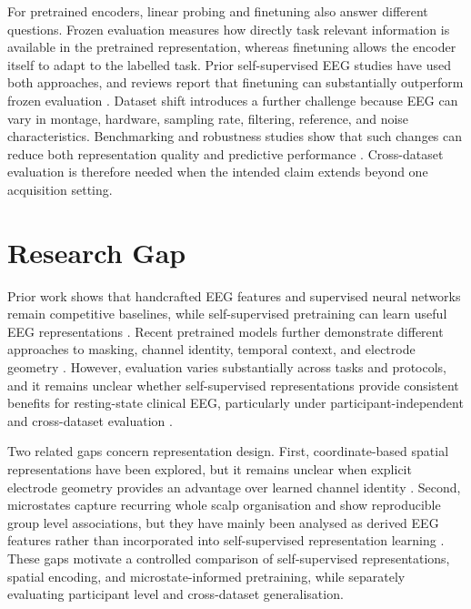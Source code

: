 For pretrained encoders, linear probing and finetuning also answer different questions. Frozen evaluation measures how directly task relevant information is available in the pretrained representation, whereas finetuning allows the encoder itself to adapt to the labelled task. Prior self-supervised EEG studies have used both approaches, and reviews report that finetuning can substantially outperform frozen evaluation \parencite{banvilleUncoveringStructureClinical2020,kuruppuEEGFoundationModels2025}. Dataset shift introduces a further challenge because EEG can vary in montage, hardware, sampling rate, filtering, reference, and noise characteristics. Benchmarking and robustness studies show that such changes can reduce both representation quality and predictive performance \parencite{engemannReusableBenchmarkBrainAge2021,waghEvaluatingLatentSpaceRobustness2022}. Cross-dataset evaluation is therefore needed when the intended claim extends beyond one acquisition setting.

\section{Research Gap}\label{sec:rel_positioning}

Prior work shows that handcrafted EEG features and supervised neural networks remain competitive baselines, while self-supervised pretraining can learn useful EEG representations \parencite{gemeinMachineLearningBasedDiagnostics2020,banvilleUncoveringStructureClinical2020,kostasBENDRUsingTransformers2021}. Recent pretrained models further demonstrate different approaches to masking, channel identity, temporal context, and electrode geometry \parencite{jiangLARGEBRAINMODEL2024,wangEEGPTPretrainedTransformer2024,wangCBraModCrissCrossBrain2025a,el2026reve}. However, evaluation varies substantially across tasks and protocols, and it remains unclear whether self-supervised representations provide consistent benefits for resting-state clinical EEG, particularly under participant-independent and cross-dataset evaluation \parencite{kuruppuEEGFoundationModels2025}.

Two related gaps concern representation design. First, coordinate-based spatial representations have been explored, but it remains unclear when explicit electrode geometry provides an advantage over learned channel identity \parencite{el2026reve}. Second, microstates capture recurring whole scalp organisation and show reproducible group level associations, but they have mainly been analysed as derived EEG features rather than incorporated into self-supervised representation learning \parencite{khannaReliabilityRestingStateMicrostate2014a,koenigEEGMetaMicrostates2023}. These gaps motivate a controlled comparison of self-supervised representations, spatial encoding, and microstate-informed pretraining, while separately evaluating participant level and cross-dataset generalisation.
